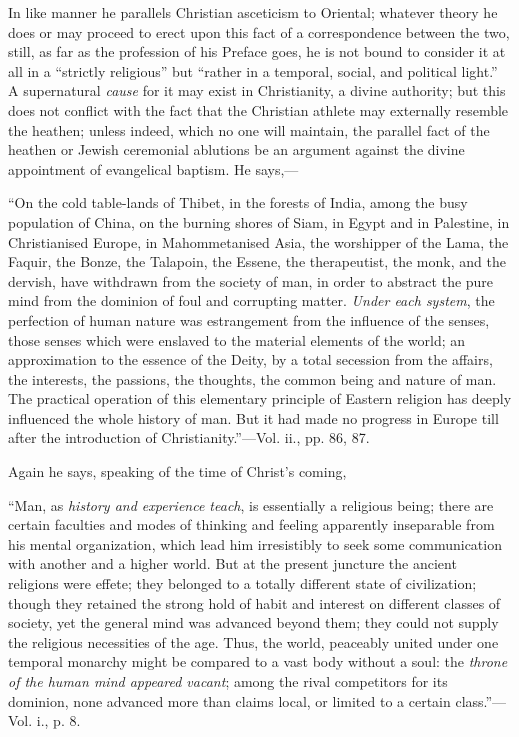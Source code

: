 In like manner he parallels Christian asceticism
to Oriental; whatever theory he does or may proceed to erect upon this
fact of a correspondence between the two, still, as far as the
profession of his Preface goes, he is not bound to consider it at all
in a ``strictly religious'' but ``rather in a temporal, social, and
political light.'' A supernatural \emph{cause} for it may exist in
Christianity, a divine authority; but this does not conflict with the
fact that the Christian athlete may externally resemble the heathen;
unless indeed, which no one will maintain, the parallel fact of the
heathen or Jewish ceremonial ablutions be an argument against the
divine appointment of evangelical baptism. He says,—

``On
the cold table-lands of Thibet, in the forests of India, among the
busy population of China, on the burning shores of Siam, in Egypt and
in Palestine, in Christianised Europe, in Mahommetanised Asia, the
worshipper of the Lama, the Faquir, the Bonze, the Talapoin, the
Essene, the therapeutist, the monk, and the dervish, have withdrawn
from the society of man, in order to abstract the pure mind from the
dominion of foul and corrupting matter. \emph{Under each system}, the
perfection of human nature was estrangement from the influence of the
senses, those senses which were enslaved to the material elements of
the world; an approximation to the essence of the Deity, by a total
secession from the affairs, the interests, the passions, the thoughts,
the common being and nature of man. The practical operation of this
elementary principle of Eastern religion has deeply influenced the
whole history of man. But it had made no progress in Europe till after
the introduction of Christianity.''—Vol. ii., pp. 86, 87.

Again he says, speaking of the time of Christ's
coming,

``Man,
as \emph{history and experience teach}, is essentially a religious
being; there are certain faculties and modes of thinking and feeling
apparently inseparable from his mental organization, which lead him
irresistibly to seek some communication with another and a higher
world. But at the present juncture the ancient religions were effete;
they belonged to a totally different state of civilization; though
they retained the strong hold of habit and interest on different
classes of society, yet the general mind was advanced beyond them;
they could not supply the religious necessities of the age. Thus, the
world, peaceably united under one temporal monarchy might
be compared to a vast body without a soul: the \emph{throne of the human
mind appeared vacant}; among the rival competitors for its
dominion, none advanced more than claims local, or limited to a
certain class.''—Vol. i., p. 8.

